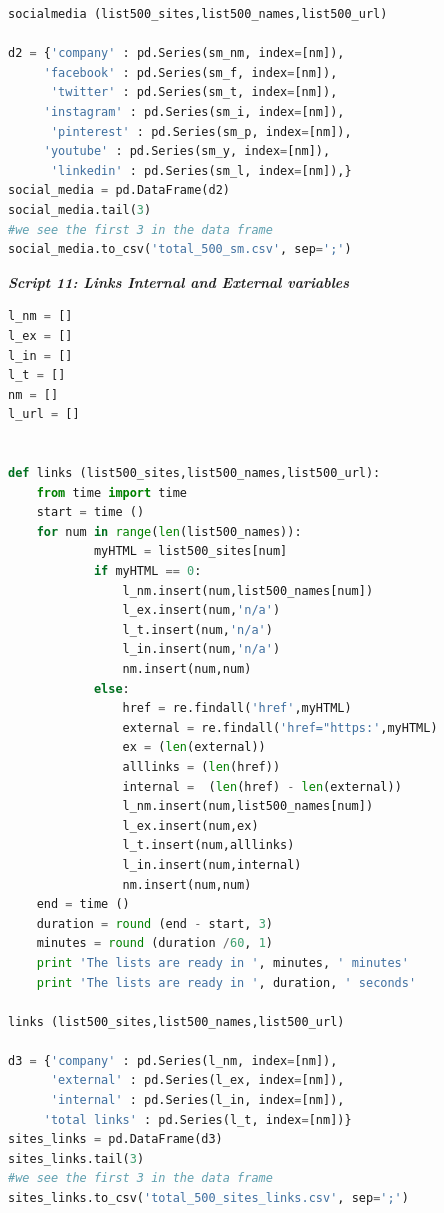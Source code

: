 \documentclass{book}
\begin{document}
\begin{lstlisting}[language=Python]
socialmedia (list500_sites,list500_names,list500_url)

d2 = {'company' : pd.Series(sm_nm, index=[nm]),
     'facebook' : pd.Series(sm_f, index=[nm]),
      'twitter' : pd.Series(sm_t, index=[nm]),
     'instagram' : pd.Series(sm_i, index=[nm]),
      'pinterest' : pd.Series(sm_p, index=[nm]),
     'youtube' : pd.Series(sm_y, index=[nm]),
      'linkedin' : pd.Series(sm_l, index=[nm]),}
social_media = pd.DataFrame(d2)
social_media.tail(3) 
#we see the first 3 in the data frame
social_media.to_csv('total_500_sm.csv', sep=';') 
\end{lstlisting}

\begin{center}
\textit{\textbf{Script 11: Links Internal and External variables}} \label{p11}
\end{center}
\begin{lstlisting}[language=Python]
l_nm = []
l_ex = []
l_in = []
l_t = []
nm = []
l_url = []


def links (list500_sites,list500_names,list500_url):
    from time import time    
    start = time ()
    for num in range(len(list500_names)):        
            myHTML = list500_sites[num]
            if myHTML == 0:
                l_nm.insert(num,list500_names[num])            
                l_ex.insert(num,'n/a')
                l_t.insert(num,'n/a')
                l_in.insert(num,'n/a')
                nm.insert(num,num)                
            else: 
                href = re.findall('href',myHTML)
                external = re.findall('href="https:',myHTML)
                ex = (len(external))
                alllinks = (len(href))
                internal =  (len(href) - len(external))
                l_nm.insert(num,list500_names[num])            
                l_ex.insert(num,ex)
                l_t.insert(num,alllinks)
                l_in.insert(num,internal)
                nm.insert(num,num)                
    end = time ()
    duration = round (end - start, 3)
    minutes = round (duration /60, 1)
    print 'The lists are ready in ', minutes, ' minutes'
    print 'The lists are ready in ', duration, ' seconds'
 
links (list500_sites,list500_names,list500_url)

d3 = {'company' : pd.Series(l_nm, index=[nm]),
      'external' : pd.Series(l_ex, index=[nm]),
      'internal' : pd.Series(l_in, index=[nm]),
     'total links' : pd.Series(l_t, index=[nm])}
sites_links = pd.DataFrame(d3)    
sites_links.tail(3) 
#we see the first 3 in the data frame
sites_links.to_csv('total_500_sites_links.csv', sep=';')
\end{lstlisting}
\end{document}
